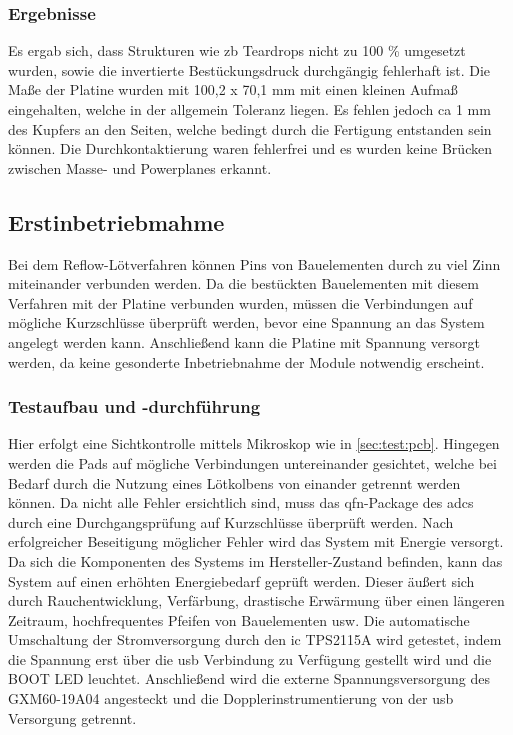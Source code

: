 \subsubsection*{Ergebnisse}
Es ergab sich, dass Strukturen wie \ac{zb} Teardrops nicht zu 100 \% umgesetzt wurden, sowie die invertierte Bestückungsdruck durchgängig fehlerhaft ist. Die Maße der Platine wurden mit 100,2 x 70,1 mm mit einen kleinen Aufmaß eingehalten, welche in der allgemein Toleranz liegen. Es fehlen jedoch \ac{ca} 1 mm des Kupfers an den Seiten, welche bedingt durch die Fertigung entstanden sein können. Die Durchkontaktierung waren fehlerfrei und es wurden keine Brücken zwischen Masse- und Powerplanes erkannt.
\subsection{Erstinbetriebmahme}
Bei dem Reflow-Lötverfahren können Pins von Bauelementen durch zu viel Zinn miteinander verbunden werden. Da die bestückten Bauelementen mit diesem Verfahren mit der Platine verbunden wurden, müssen die Verbindungen auf mögliche Kurzschlüsse überprüft werden, bevor eine Spannung an das System angelegt werden kann. Anschließend kann die Platine mit Spannung versorgt werden, da keine gesonderte Inbetriebnahme der Module notwendig erscheint.
\subsubsection*{Testaufbau und -durchführung}
Hier erfolgt eine Sichtkontrolle mittels Mikroskop wie in \autoref{sec:test:pcb}. Hingegen werden die Pads auf mögliche Verbindungen untereinander gesichtet, welche bei Bedarf durch die Nutzung eines Lötkolbens von einander getrennt werden können. Da nicht alle Fehler ersichtlich sind, muss das \ac{qfn}-Package des \ac{adc}s durch eine Durchgangsprüfung auf Kurzschlüsse überprüft werden. Nach erfolgreicher Beseitigung möglicher Fehler wird das System mit Energie versorgt. Da sich die Komponenten des Systems im Hersteller-Zustand befinden, kann das System auf einen erhöhten Energiebedarf geprüft werden. Dieser äußert sich durch Rauchentwicklung, Verfärbung, drastische Erwärmung über einen längeren Zeitraum, hochfrequentes Pfeifen von Bauelementen \ac{usw}. Die automatische Umschaltung der Stromversorgung durch den \ac{ic} TPS2115A\cite{ti_tps2115a} wird getestet, indem die Spannung erst über die \ac{usb} Verbindung zu Verfügung gestellt wird und die \glqq BOOT\grqq{} LED leuchtet. Anschließend wird die externe Spannungsversorgung des GXM60-19A04 angesteckt und die Dopplerinstrumentierung von der \ac{usb} Versorgung getrennt.
